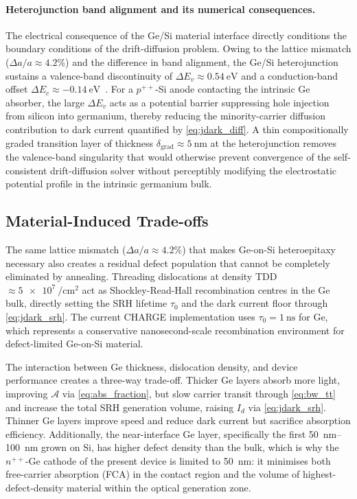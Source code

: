 \paragraph{Heterojunction band alignment and its numerical consequences.}
The electrical consequence of the Ge/Si material interface directly conditions
the boundary conditions of the drift-diffusion problem. Owing to the lattice
mismatch ($\Delta a/a\approx4.2\%$) and the difference in band alignment, the
Ge/Si heterojunction sustains a valence-band discontinuity of
$\Delta E_v\approx\SI{0.54}{\electronvolt}$ and a conduction-band offset
$\Delta E_c\approx\SI{-0.14}{\electronvolt}$~\cite{Basu2003}. For a $p^{++}$-Si
anode contacting the intrinsic Ge absorber, the large $\Delta E_v$ acts as a
potential barrier suppressing hole injection from silicon into germanium, thereby
reducing the minority-carrier diffusion contribution to dark current quantified by
\cref{eq:jdark_diff}. A thin compositionally graded transition layer of thickness
$\delta_{\mathrm{grad}}\approx\SI{5}{\nano\metre}$ at the heterojunction removes
the valence-band singularity that would otherwise prevent convergence of the
self-consistent drift-diffusion solver without perceptibly modifying the
electrostatic potential profile in the intrinsic germanium bulk.

\subsection[Material-Induced Trade-offs]{Material-Induced Trade-offs}
\label{subsec:pd_ge_tradeoffs}

The same lattice mismatch ($\Delta a/a\approx4.2\%$) that makes Ge-on-Si
heteroepitaxy necessary also creates a residual defect population that cannot be
completely eliminated by annealing. Threading dislocations at density
TDD $\approx\SI{5e7}{\per\centi\metre\squared}$ act as Shockley-Read-Hall
recombination centres in the Ge bulk, directly setting the SRH lifetime $\tau_0$
and the dark current floor through \cref{eq:jdark_srh}. The current CHARGE
implementation uses $\tau_0=\SI{1}{\nano\second}$ for Ge, which represents a
conservative nanosecond-scale recombination environment for defect-limited
Ge-on-Si material.

The interaction between Ge thickness, dislocation density, and device performance
creates a three-way trade-off. Thicker Ge layers absorb more light, improving
$\mathcal{A}$ via \cref{eq:abs_fraction}, but slow carrier transit through
\cref{eq:bw_tt} and increase the total SRH generation volume, raising $I_d$ via
\cref{eq:jdark_srh}. Thinner Ge layers improve speed and reduce dark current but
sacrifice absorption efficiency. Additionally, the near-interface Ge layer,
specifically the first \SIrange{50}{100}{\nano\metre} grown on Si, has higher
defect density than the bulk, which is why the $n^{++}$-Ge cathode of the
present device is limited to \SI{50}{\nano\metre}: it minimises both free-carrier absorption (FCA)
in the contact region and the volume of highest-defect-density material within
the optical generation zone.

